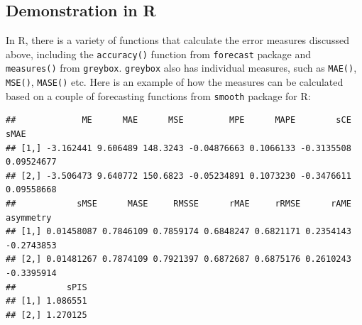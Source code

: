 \documentclass[
]{book}
\newenvironment{Shaded}{\begin{snugshade}}{\end{snugshade}}
\newcommand{\AttributeTok}[1]{\textcolor[rgb]{0.77,0.63,0.00}{#1}}
\newcommand{\ConstantTok}[1]{\textcolor[rgb]{0.00,0.00,0.00}{#1}}
\newcommand{\DecValTok}[1]{\textcolor[rgb]{0.00,0.00,0.81}{#1}}
\newcommand{\FunctionTok}[1]{\textcolor[rgb]{0.00,0.00,0.00}{#1}}
\newcommand{\NormalTok}[1]{#1}
\newcommand{\OtherTok}[1]{\textcolor[rgb]{0.56,0.35,0.01}{#1}}
\newcommand{\SpecialCharTok}[1]{\textcolor[rgb]{0.00,0.00,0.00}{#1}}
\theoremstyle{definition}
\theoremstyle{definition}
\theoremstyle{definition}
\theoremstyle{definition}
\theoremstyle{remark}
\begin{document}
\hypertarget{demonstration-in-r}{%
\subsection{Demonstration in R}\label{demonstration-in-r}}

In R, there is a variety of functions that calculate the error measures discussed above, including the \texttt{accuracy()} function from \texttt{forecast} package and \texttt{measures()} from \texttt{greybox}. \texttt{greybox} also has individual measures, such as \texttt{MAE()}, \texttt{MSE()}, \texttt{MASE()} etc. Here is an example of how the measures can be calculated based on a couple of forecasting functions from \texttt{smooth} package for R:

\begin{Shaded}
\end{Shaded}

\begin{verbatim}
##             ME      MAE      MSE         MPE      MAPE        sCE       sMAE
## [1,] -3.162441 9.606489 148.3243 -0.04876663 0.1066133 -0.3135508 0.09524677
## [2,] -3.506473 9.640772 150.6823 -0.05234891 0.1073230 -0.3476611 0.09558668
##            sMSE      MASE     RMSSE      rMAE     rRMSE      rAME  asymmetry
## [1,] 0.01458087 0.7846109 0.7859174 0.6848247 0.6821171 0.2354143 -0.2743853
## [2,] 0.01481267 0.7874109 0.7921397 0.6872687 0.6875176 0.2610243 -0.3395914
##          sPIS
## [1,] 1.086551
## [2,] 1.270125
\end{verbatim}
\end{document}
